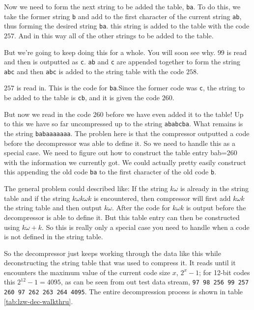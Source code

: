 \begin{refsection}
Now we need to form the next string to be added the table,
\texttt{ba}. To do this, we take the former string \texttt{b} and add
to the first character of the current string \texttt{ab}, thus forming
the desired string \texttt{ba}. this string is added to the table with
the code $257$. And in this way all of the other strings to be added
to the table.

But we're going to keep doing this for a whole. You will soon see
why. $99$ is read and then is outputted as \texttt{c}. \texttt{ab} and
\texttt{c} are appended together to form the string \texttt{abc} and then
\texttt{abc} is added to the string table with the code $258$.

$257$ is read in. This is the code for \texttt{ba}.Since the former
code was \texttt{c}, the string to be added to the table is
\texttt{cb}, and it is given the code $260$.

But now we read in the code $260$ before we have even added it to the
table! Up to this we have so far uncompressed up to the string
\texttt{ababcba}. What remains is the string \texttt{babaaaaaaa}. The
problen here is that the compressor outputted a code before the
decompressor was able to define it. So we need to handle this as a
special case. We need to figure out how to construct the table entry
bab=260 with the information we currently got. We could actually
pretty easily construct this appending the old code \texttt{ba} to the
first character of the old code \texttt{b}.

\newcommand{\ko}{\ensuremath{k\omega}\xspace}
\newcommand{\kok}{\ensuremath{\ko k}\xspace}
\newcommand{\kokok}{\ensuremath{\kok \omega k}\xspace}

The general problem could described like: If the string \ko is already
in the string table and if the string \kokok is encountered, then
compressor will first add \kok the string table and then output
\ko. After the code for \kok is output before the decompressor is able
to define it. But this table entry can then be constructed using $\ko
+k$.  So this is really only a special case you need to handle when a
code is not defined in the string table.

So the decompressor just keeps working through the data like this while
deconstructing the string table that was used to compress it. It reads
until it encounters the maximum value of the current code size $x$,
$2^{x}-1$; for 12-bit codes this $2^{12} - 1 = 4095$, as can be seen
from out test data stream, \texttt{97 98 256 99 257 260 97 262 263 264
  4095}. The entire decompression process is shown in table \ref{tab:lzw-dec-walkthru}.


\end{refsection}
